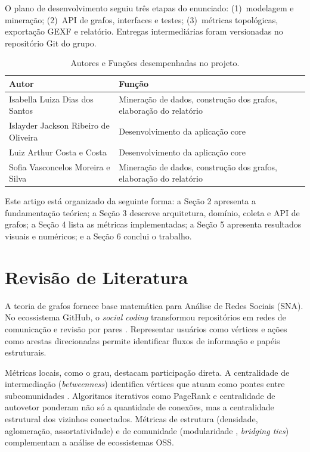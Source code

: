 \documentclass[12pt]{article}
\begin{document}
O plano de desenvolvimento seguiu três etapas do enunciado: (1)~modelagem e mineração; (2)~API de grafos, interfaces e testes; (3)~métricas topológicas, exportação GEXF e relatório. Entregas intermediárias foram versionadas no repositório Git do grupo.
\begin{table}[H]
\centering
\caption{Autores e Funções desempenhadas no projeto.}
\vspace{0.2cm}
\begin{tabular}{|p{7cm}|p{8cm}|}
\hline
\textbf{Autor} & \textbf{Função} \\ \hline
Isabella Luiza Dias dos Santos & Mineração de dados, construção dos grafos, elaboração do relatório \\ \hline
Islayder Jackson Ribeiro de Oliveira & Desenvolvimento da aplicação core \\ \hline
Luiz Arthur Costa e Costa & Desenvolvimento da aplicação core \\ \hline
Sofia Vasconcelos Moreira e Silva & Mineração de dados, construção dos grafos, elaboração do relatório \\ \hline
\end{tabular}
\label{tab:tarefas}
\end{table}

Este artigo está organizado da seguinte forma: a Seção 2 apresenta a fundamentação teórica; a Seção 3 descreve arquitetura, domínio, coleta e API de grafos; a Seção 4 lista as métricas implementadas; a Seção 5 apresenta resultados visuais e numéricos; e a Seção 6 conclui o trabalho.

\section{Revisão de Literatura}
\label{sec:literatura}

A teoria de grafos fornece base matemática para Análise de Redes Sociais (SNA). No ecossistema GitHub, o \textit{social coding} transformou repositórios em redes de comunicação e revisão por pares \cite{dabbish2012}. Representar usuários como vértices e ações como arestas direcionadas permite identificar fluxos de informação e papéis estruturais.

Métricas locais, como o grau, destacam participação direta. A centralidade de intermediação (\textit{betweenness}) identifica vértices que atuam como pontes entre subcomunidades \cite{freeman1977}. Algoritmos iterativos como PageRank \cite{page1999} e centralidade de autovetor ponderam não só a quantidade de conexões, mas a centralidade estrutural dos vizinhos conectados. Métricas de estrutura (densidade, aglomeração, assortatividade) e de comunidade (modularidade \cite{newman2006}, \textit{bridging ties}) complementam a análise de ecossistemas OSS.
\end{document}
